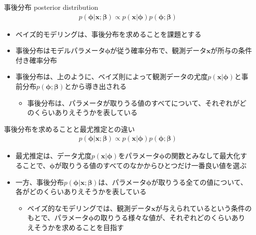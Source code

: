 \documentclass[aspectratio=169,unicode,dvipdfmx,14pt]{beamer}
\begin{document}
\begin{frame}{事後分布 posterior distribution}
\begin{align}
p(\bm{\phi}|\bm{x};\bm{\beta}) \propto p(\bm{x}|\bm{\phi})p(\bm{\phi};\bm{\beta})
\end{align}
\vspace{-.2in}
\begin{itemize}
\item ベイズ的モデリングは、事後分布を求めることを課題とする
\item 事後分布はモデルパラメータ$\bm{\phi}$が従う確率分布で、観測データ$\bm{x}$が所与の条件付き確率分布
\item 事後分布は、上のように、ベイズ則によって観測データの尤度$p(\bm{x}|\bm{\phi})$と事前分布$p(\bm{\phi};\bm{\beta})$とから導き出される
\begin{itemize}
\item 事後分布は、パラメータが取りうる値のすべてについて、それぞれがどのくらいありえそうかを表している
\end{itemize}
\end{itemize}
\end{frame}

\begin{frame}{事後分布を求めることと最尤推定との違い}
\vspace{-.2in}
\begin{align}
p(\bm{\phi}|\bm{x};\bm{\beta}) \propto p(\bm{x}|\bm{\phi})p(\bm{\phi};\bm{\beta})
\end{align}
\vspace{-.2in}
\begin{itemize}
\item 最尤推定は、データ尤度$p(\bm{x}|\bm{\phi})$をパラメータ$\bm{\phi}$の関数とみなして最大化することで、$\bm{\phi}$が取りうる値のすべてのなかからひとつだけ一番良い値を選ぶ
\item 一方、事後分布$p(\bm{\phi}|\bm{x};\bm{\beta})$は、パラメータ$\bm{\phi}$が取りうる全ての値について、各がどのくらいありえそうかを表している
\begin{itemize}
\item ベイズ的なモデリングでは、観測データ$\bm{x}$が与えられているという条件のもとで、パラメータ$\bm{\phi}$の取りうる様々な値が、それぞれどのくらいありえそうかを求めることを目指す
\end{itemize}
\end{itemize}
\end{frame}
\end{document}
